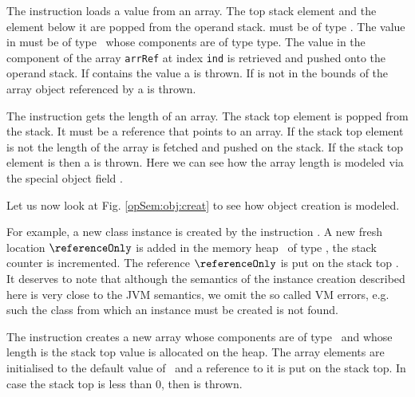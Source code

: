 The instruction \arrload{}   loads a value from an array. The top stack element \stackOnlyParam{\counterOnly} and 
the element below it 
  are popped from the operand stack.  \stackOnlyParam{\counterOnly} must be of type \Myint. The value in  must be 
 of type  \ whose components are of type \textrm{type}. The value in the component of the array  \texttt{arrRef} 
 at index \texttt{ind} is retrieved and pushed onto the operand stack.
 If  contains the value \Mynull{} a \NullPointerExc{} is thrown. If \stackOnlyParam{\counterOnly}  is
not in the bounds of the array object referenced by   a \ArrIndexOutOfBoundExc{} is thrown.

The instruction \arraylength{} gets the length of an array.
 The stack top element is popped from the stack. It must be a 
reference that points to an array. If the stack top element \stackOnlyParam{\counterOnly} is not \Mynull{}  the length of the array  
\length{\stackOnlyParam{\counterOnly} } is fetched and pushed on the stack.
If the stack top element \stackOnlyParam{\counterOnly} is \Mynull{} then a \NullPointerExc{} is thrown. Here we can see how the array
 length is modeled via the special object field \length. 


Let us now look at Fig. \ref{opSem:obj:creat} to  see how 
object creation is modeled.

 For example, a new class instance
is created by the instruction \new.  A new fresh location $\referenceOnly$ is added in the memory heap 
\heap \ of type  \clazz, the  stack counter \counterOnly is incremented. The reference $\referenceOnly$ 
is put on the stack  top . It deserves to note that although the semantics of the instance creation
 described here  is very close to the JVM semantics, we omit the so called VM errors, e.g. such the class from which an
 instance must be created is not found.    

The instruction \newarray creates a new array whose components are of type \anyType \ and whose length is the stack top value is allocated on the heap.
The array elements are initialised to the default value of  \anyType \ and a reference to it is put on the stack top. 
In case the stack top is less than 0, then \NegativeArraySizeExc{} is thrown.

